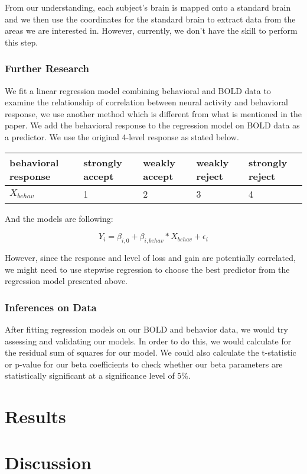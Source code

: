 \documentclass[11pt]{article}
\begin{document}
From our understanding, each subject's brain is mapped onto a standard brain and we then use the coordinates for the standard brain to extract data from the areas we are interested in. However, currently, we don't have the skill to perform this step.

\subsubsection{Further Research}

We fit a linear regression model combining behavioral and BOLD data to examine the relationship of correlation between neural activity and behavioral response, we use another method which is different from what is mentioned in the paper. We add the behavioral response to the regression model on BOLD data as a predictor. We use the original 4-level response as stated below. \\ 

\begin{tabular}{lllll}
\hline
behavioral response & strongly accept & weakly accept & weakly reject & strongly reject\\ 
\hline
$X_{behav}$ & 1 & 2 & 3 & 4 \\
\hline
\end{tabular}

And the models are following:

\begin{equation}
Y_{i} = \beta_{i, 0} + \beta_{i, behav} * X_{behav} + \epsilon_i
\end{equation}

However, since the response and level of loss and gain are potentially correlated, we might need to use stepwise regression to choose the best predictor from the regression model presented above.

\subsubsection{Inferences on Data}
\indent \indent After fitting regression models on our BOLD and behavior data, we would try assessing and validating our models. In order to do this, we would calculate for the residual sum of squares for our model. We could also calculate the t-statistic or p-value for our beta coefficients to check whether our beta parameters are statistically significant at a significance level of 5\%.


\section{Results}
\section{Discussion}



\end{document}
